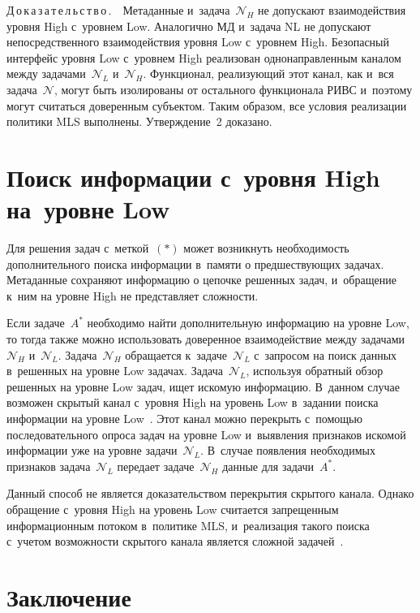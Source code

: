 \begin{multicols}{2}
  \smallskip
  
  \noindent
  Д\,о\,к\,а\,з\,а\,т\,е\,л\,ь\,с\,т\,в\,о\,.\ \ Метаданные
   и~задача~$\mathcal{N}_H$ не 
допускают взаимодействия уровня High с~уровнем Low. Аналогично МД и~задача 
NL не допускают непосредственного взаимодействия уровня Low с~уровнем High. 
Безопасный интерфейс уровня Low с~уровнем High реализован 
однонаправленным каналом между задачами~$\mathcal{N}_L$ 
и~$\mathcal{N}_H$. Функционал, реализующий этот канал, как и~вся 
задача~$\mathcal{N}$, могут быть изолированы от остального функционала РИВС и~поэтому могут считаться доверенным субъектом. Таким образом, все условия 
реализации политики MLS выполнены. Утверждение~2 доказано. 
  
  \section{Поиск информации с~уровня High на~уровне Low}
  
  Для решения задач с~меткой~$(*)$ может возникнуть необходимость 
дополнительного поиска информации в~памяти о предшествующих задачах. 
Метаданные сохраняют информацию о цепочке решенных задач, и~обращение 
к~ним на уровне High не представляет сложности. 
  
  Если задаче~$A^*$ необходимо найти дополнительную информацию на уровне 
Low, то тогда также можно использовать доверенное взаимодействие между 
задачами~$\mathcal{N}_H$ и~$\mathcal{N}_L$. Задача~$\mathcal{N}_H$ 
обращается к~задаче~$\mathcal{N}_L$ с~запросом на поиск данных в~решенных на 
уровне Low задачах. Задача~$\mathcal{N}_L$, используя обратный обзор 
решенных на уровне Low задач, ищет искомую информацию. В~данном случае 
возможен скрытый канал с~уровня High на уровень Low в~задании поиска 
информации на уровне Low~\cite{8-tt}. Этот канал можно перекрыть с~помощью 
последовательного опроса задач на уровне Low и~выявления признаков искомой 
информации уже на уровне задачи~$\mathcal{N}_L$. В~случае появления 
необходимых признаков задача~$\mathcal{N}_L$ передает 
задаче~$\mathcal{N}_H$ данные для задачи~$A^*$. 
  
  Данный способ не является доказательством перекрытия скрытого канала. 
Однако обращение с~уровня High на уровень Low считается запрещенным 
информационным потоком в~политике MLS, и~реализация такого поиска с~учетом 
возможности скрытого канала является сложной задачей~\cite{10-tt}. 
  
  \section{Заключение }
  

\end{multicols}
